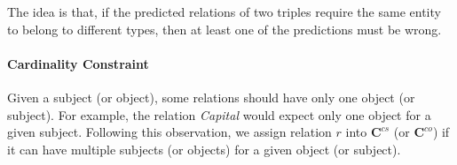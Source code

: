 The idea is that, if the predicted relations of two triples require the same entity to belong to different types, then at least one of the predictions must be wrong.


\paragraph{Cardinality Constraint}
Given a subject (or object), some relations should have only one object (or subject).
For example, the relation \emph{Capital} would expect only one object for a given subject.
Following this observation, we assign relation $r$ into $\bm{C}^{cs}$ (or $\bm{C}^{co}$) if it can have multiple subjects (or objects) for a given object (or subject).

